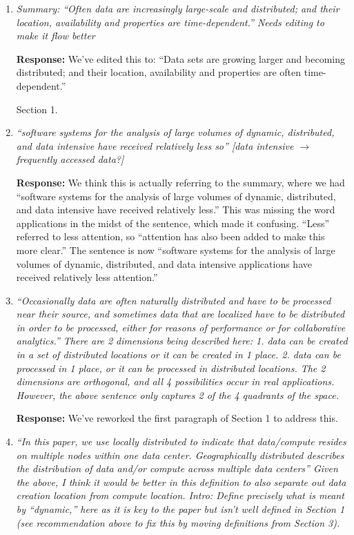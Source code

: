\documentclass{article}
\begin{document}
\begin{enumerate}

\item \emph{Summary: ``Often data are increasingly large-scale and distributed; and their location, availability and properties are time-dependent.'' Needs editing to make it flow better}

\textbf{Response:} We've edited this to: ``Data sets are growing larger and becoming distributed; and their location, availability and properties are often time-dependent.''

\hspace{-0.7cm}Section 1. 

\item \emph{``software systems for the analysis of large volumes of dynamic, distributed, and data intensive have received relatively less so'' [data intensive $\rightarrow$ frequently accessed data?]}

\textbf{Response:} We think this is actually referring to the summary, where we had ``software systems for the analysis of large volumes of dynamic, distributed, and data intensive have received relatively less.''  This was missing the word applications in the midst of the sentence, which made it confusing. ``Less'' referred to less attention, so ``attention has also been added to make this more clear.'' The sentence is now ``software systems for the analysis of large volumes of dynamic, distributed, and data intensive applications have received relatively less attention.''

\item \emph{``Occasionally data are often naturally distributed and have to be processed near their source, and sometimes data that are localized have to be distributed in order to be processed, either for reasons of performance or for collaborative analytics.'' There are 2 dimensions being described here: 1. data can be created in a set of distributed locations or it can be created in 1 place. 2. data can be processed in 1 place, or it can be processed in distributed locations. The 2 dimensions are orthogonal, and all 4 possibilities occur in real applications. However, the above sentence only captures 2 of the 4 quadrants of the space.}

\textbf{Response:} We've reworked the first paragraph of Section 1 to address this.

\item \emph{``In this paper, we use locally distributed to indicate that data/compute resides on multiple nodes within one data center. Geographically distributed describes the distribution of data and/or compute across multiple data centers'' Given the above, I think it would be better in this definition to also separate out data creation location from compute location. Intro: Define precisely what is meant by ``dynamic,'' here as it is key to the paper but isn't well defined in Section 1 (see recommendation above to fix this by moving definitions from Section 3).}


\end{enumerate}
\end{document}
